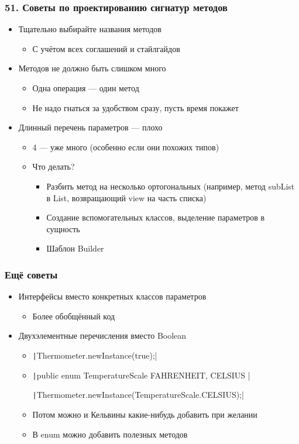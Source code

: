 \documentclass[xetex,mathserif,serif]{beamer}
\begin{document}
	\begin{frame}
		\frametitle{51. Советы по проектированию сигнатур методов}
		\begin{itemize}
			\item Тщательно выбирайте названия методов
			\begin{itemize}
				\item С учётом всех соглашений и стайлгайдов
			\end{itemize}
			\item Методов не должно быть слишком много
			\begin{itemize}
				\item Одна операция --- один метод
				\item Не надо гнаться за удобством сразу, пусть время покажет
			\end{itemize}
			\item Длинный перечень параметров --- плохо
			\begin{itemize}
				\item 4 --- уже много (особенно если они похожих типов)
				\item Что делать?
				\begin{itemize}
					\item Разбить метод на несколько ортогональных (например, метод subList в List, возвращающий view на часть списка)
					\item Создание вспомогательных классов, выделение параметров в сущность
					\item Шаблон Builder
				\end{itemize}
			\end{itemize}
		\end{itemize}
	\end{frame}

	\begin{frame}
		\frametitle{Ещё советы}
		\begin{itemize}
			\item Интерфейсы вместо конкретных классов параметров
			\begin{itemize}
				\item Более обобщённый код
			\end{itemize}
			\item Двухэлементные перечисления вместо Boolean
			\begin{itemize}
				\item \texttt|Thermometer.newInstance(true);|
				\item \texttt|public enum TemperatureScale { FAHRENHEIT, CELSIUS }|
				
					\texttt|Thermometer.newInstance(TemperatureScale.CELSIUS);|
				\item Потом можно и Кельвины какие-нибудь добавить при желании
				\item В enum можно добавить полезных методов
			\end{itemize}
		\end{itemize}
	\end{frame}
\end{document}
